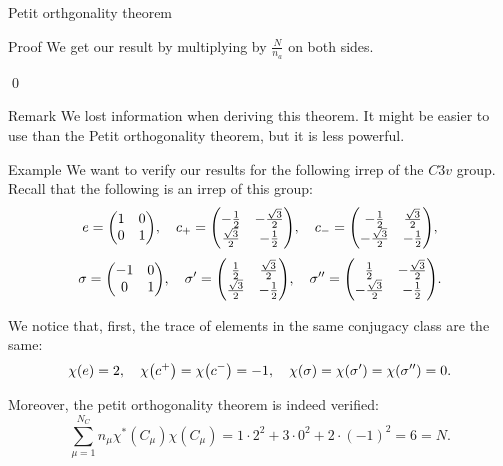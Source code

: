 \documentclass[a4paper]{article}
\begin{document}
\begin{parag}{Petit orthgonality theorem}
\begin{subparag}{Proof}
        We get our result by multiplying by $\frac{N}{n_a}$ on both sides.

        \qed
    \end{subparag}

    \begin{subparag}{Remark}
        We lost information when deriving this theorem. It might be easier to use than the Petit orthogonality theorem, but it is less powerful.
    \end{subparag}
\end{parag}

\begin{parag}{Example}
    We want to verify our results for the following irrep of the $C3v$ group. Recall that the following is an irrep of this group:
    \[e = \begin{pmatrix} 1 & 0 \\ 0 & 1 \end{pmatrix}, \mathspace c_+ = \begin{pmatrix} -\frac{1}{2} & -\frac{\sqrt{3}}{2} \\ \frac{\sqrt{3}}{2} & -\frac{1}{2} \end{pmatrix}, \mathspace c_- = \begin{pmatrix} -\frac{1}{2} & \frac{\sqrt{3}}{2} \\ -\frac{\sqrt{3}}{2} & -\frac{1}{2} \end{pmatrix},\]
    \[\sigma = \begin{pmatrix} -1 & 0 \\ 0 & 1 \end{pmatrix}, \mathspace \sigma' = \begin{pmatrix} \frac{1}{2} & \frac{\sqrt{3}}{2} \\ \frac{\sqrt{3}}{2} & -\frac{1}{2} \end{pmatrix}, \mathspace \sigma'' = \begin{pmatrix} \frac{1}{2} & -\frac{\sqrt{3}}{2} \\ -\frac{\sqrt{3}}{2} & -\frac{1}{2} \end{pmatrix}.\]


    We notice that, first, the trace of elements in the same conjugacy class are the same: 
    \[\chi\left(e\right) = 2, \mathspace \chi\left(c^+\right) = \chi\left(c^-\right) = -1, \mathspace \chi\left(\sigma\right) = \chi\left(\sigma'\right) = \chi\left(\sigma''\right) = 0.\]
    
    Moreover, the petit orthogonality theorem is indeed verified: 
    \[\sum_{\mu=1}^{N_C} n_{\mu} \chi^*\left(C_{\mu}\right) \chi\left(C_{\mu}\right) = 1\cdot 2^2 + 3\cdot 0^2 + 2\cdot \left(-1\right)^2 = 6 = N.\]
\end{parag}
\end{document}

